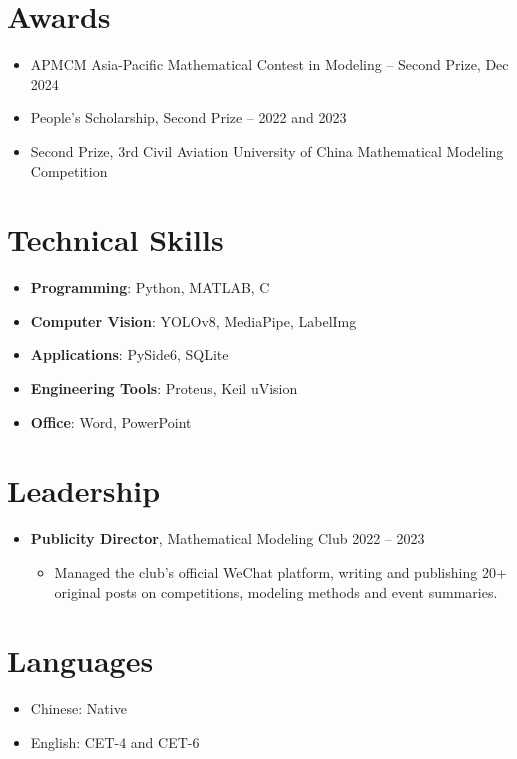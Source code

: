 \documentclass[10pt,a4paper]{article}
\newcommand{\skill}[2]{%
  \item \textbf{#1}: #2
}
\begin{document}
\section{Awards}
\begin{itemize}
  \item APMCM Asia-Pacific Mathematical Contest in Modeling -- Second Prize,
        Dec 2024
  \item People's Scholarship, Second Prize -- 2022 and 2023
  \item Second Prize, 3rd Civil Aviation University of China Mathematical
        Modeling Competition
\end{itemize}

\section{Technical Skills}
\begin{itemize}
  \skill{Programming}{Python, MATLAB, C}
  \skill{Computer Vision}{YOLOv8, MediaPipe, LabelImg}
  \skill{Applications}{PySide6, SQLite}
  \skill{Engineering Tools}{Proteus, Keil uVision}
  \skill{Office}{Word, PowerPoint}
\end{itemize}

\section{Leadership}
\begin{itemize}
  \item \textbf{Publicity Director}, Mathematical Modeling Club
        \hfill 2022 -- 2023
  \begin{itemize}
    \item Managed the club's official WeChat platform, writing and publishing
          20+ original posts on competitions, modeling methods and event
          summaries.
  \end{itemize}
\end{itemize}

\section{Languages}
\begin{itemize}
  \item Chinese: Native
  \item English: CET-4 and CET-6
\end{itemize}
\end{document}
